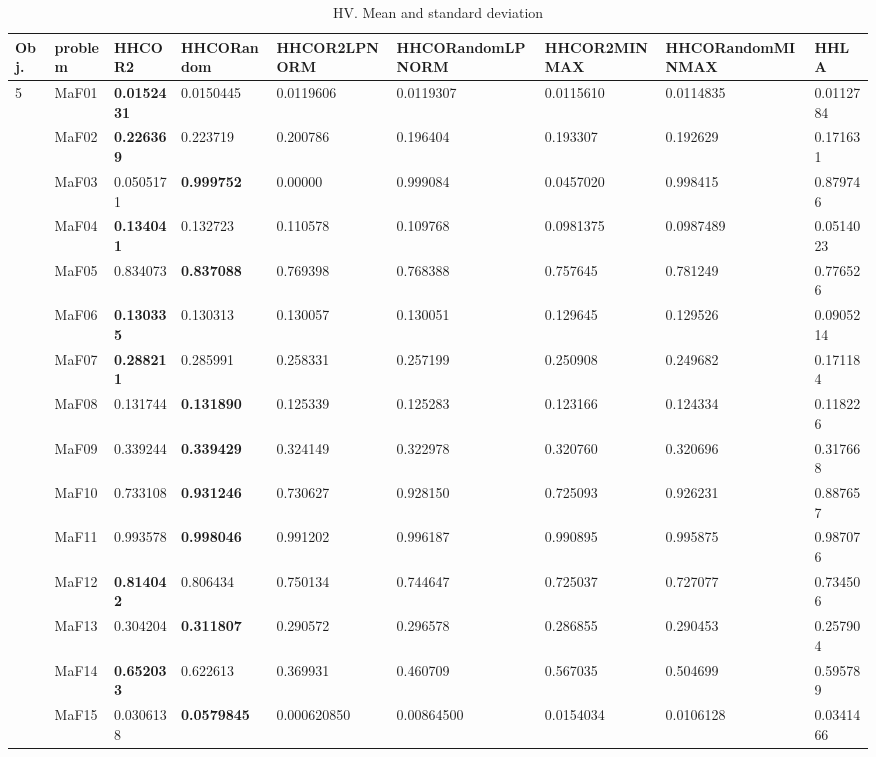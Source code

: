 \documentclass[]{article}
\begin{document}
\begin{landscape}
\begin{table}
\caption{HV. Mean and standard deviation}
\label{table:mean.HV}
\centering
\begin{footnotesize}
\begin{tabular}{|l|l|l|l|l|l|l|l|l|}
\hline
Obj. & problem  & HHCOR2 & HHCORandom & HHCOR2LPNORM & HHCORandomLPNORM & HHCOR2MINMAX & HHCORandomMINMAX & HHLA \\ \hline

\multirow{15}{*}{5} & MaF01 & \cellcolor{gray95} {\bf 0.0152431} & \cellcolor{gray95} 0.0150445 & 0.0119606 & 0.0119307 & 0.0115610 & 0.0114835 & 0.0112784\\
 & MaF02 & \cellcolor{gray95} {\bf 0.226369} & \cellcolor{gray95} 0.223719 & 0.200786 & 0.196404 & 0.193307 & 0.192629 & 0.171631\\
 & MaF03 & 0.0505171 & \cellcolor{gray95} {\bf 0.999752} & 0.00000 & \cellcolor{gray95} 0.999084 & 0.0457020 & 0.998415 & 0.879746\\
 & MaF04 & \cellcolor{gray95} {\bf 0.134041} & \cellcolor{gray95} 0.132723 & 0.110578 & 0.109768 & 0.0981375 & 0.0987489 & 0.0514023\\
 & MaF05 & \cellcolor{gray95} 0.834073 & \cellcolor{gray95} {\bf 0.837088} & 0.769398 & 0.768388 & 0.757645 & 0.781249 & 0.776526\\
 & MaF06 & \cellcolor{gray95} {\bf 0.130335} & \cellcolor{gray95} 0.130313 & \cellcolor{gray95} 0.130057 & \cellcolor{gray95} 0.130051 & 0.129645 & 0.129526 & 0.0905214\\
 & MaF07 & \cellcolor{gray95} {\bf 0.288211} & \cellcolor{gray95} 0.285991 & 0.258331 & 0.257199 & 0.250908 & 0.249682 & 0.171184\\
 & MaF08 & \cellcolor{gray95} 0.131744 & \cellcolor{gray95} {\bf 0.131890} & 0.125339 & 0.125283 & 0.123166 & 0.124334 & 0.118226\\
 & MaF09 & \cellcolor{gray95} 0.339244 & \cellcolor{gray95} {\bf 0.339429} & 0.324149 & 0.322978 & 0.320760 & 0.320696 & 0.317668\\
 & MaF10 & 0.733108 & \cellcolor{gray95} {\bf 0.931246} & 0.730627 & \cellcolor{gray95} 0.928150 & 0.725093 & \cellcolor{gray95} 0.926231 & \cellcolor{gray95} 0.887657\\
 & MaF11 & 0.993578 & \cellcolor{gray95} {\bf 0.998046} & 0.991202 & \cellcolor{gray95} 0.996187 & 0.990895 & \cellcolor{gray95} 0.995875 & 0.987076\\
 & MaF12 & \cellcolor{gray95} {\bf 0.814042} & \cellcolor{gray95} 0.806434 & 0.750134 & 0.744647 & 0.725037 & 0.727077 & 0.734506\\
 & MaF13 & \cellcolor{gray95} 0.304204 & \cellcolor{gray95} {\bf 0.311807} & 0.290572 & 0.296578 & 0.286855 & 0.290453 & 0.257904\\
 & MaF14 & \cellcolor{gray95} {\bf 0.652033} & \cellcolor{gray95} 0.622613 & 0.369931 & 0.460709 & 0.567035 & 0.504699 & \cellcolor{gray95} 0.595789\\
 & MaF15 & \cellcolor{gray95} 0.0306138 & \cellcolor{gray95} {\bf 0.0579845} & 0.000620850 & 0.00864500 & 0.0154034 & 0.0106128 & 0.0341466\\
\hline


\end{tabular}
\end{footnotesize}
\end{table}
\end{landscape}
\end{document}
